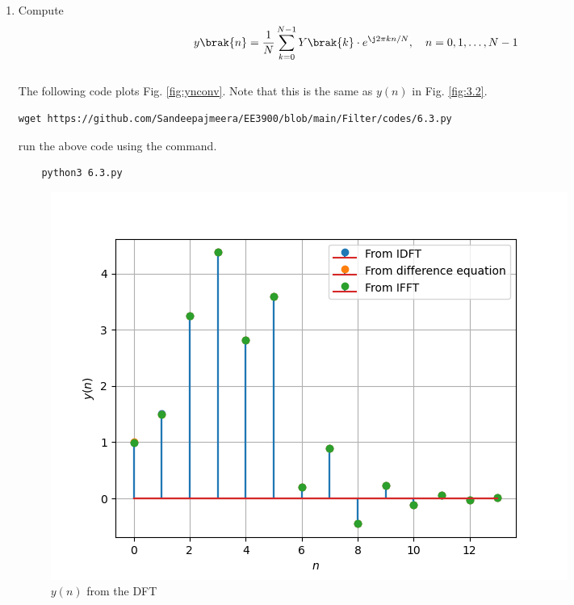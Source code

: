 \documentclass[journal,12pt,twocolumn]{IEEEtran}
\renewcommand\thesection{\arabic{section}}
\begin{document}
\begin{enumerate}[label=\thesection.\arabic*
,ref=\thesection.\theenumi]
\item Compute
\begin{equation} \label{6.3}
 y\brak{n}={\frac {1}{N}}\sum _{k=0}^{N-1}Y\brak{k}\cdot e^{\j 2\pi kn/N},\quad n = 0,1,\dots, N-1
\end{equation}
\\
\solution The following code plots Fig. \ref{fig:ynconv}. Note that this is the same as 
$y(n)$ in  Fig. 
\ref{fig:3.2}. 
%
\begin{lstlisting}
wget https://github.com/Sandeepajmeera/EE3900/blob/main/Filter/codes/6.3.py
\end{lstlisting}
run the above code using the command.
\begin{lstlisting}
	python3 6.3.py
\end{lstlisting}

\begin{figure}[!ht]
\centering
\includegraphics[width=\columnwidth]{./figs/6.3.png}
\caption{$y(n)$ from the DFT}
\label{fig:yndft}
\end{figure}


\end{enumerate}
\end{document}

